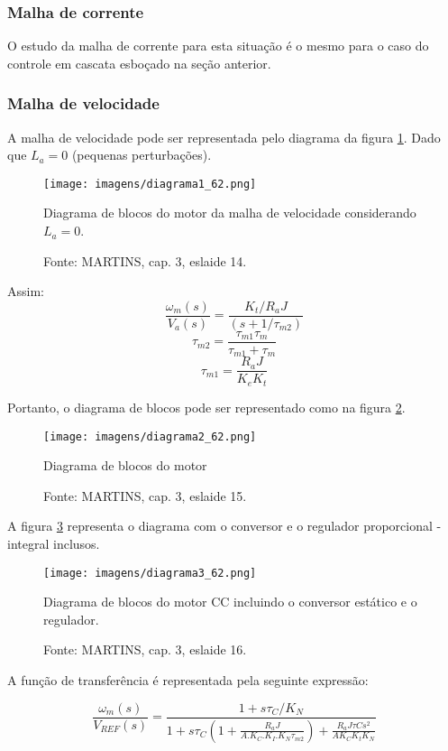 \subsubsection{Malha de corrente}

O estudo da malha de corrente para esta situação é o mesmo para o caso do controle em cascata esboçado na seção anterior.

\subsubsection{Malha de velocidade}

A malha de velocidade pode ser representada pelo diagrama da figura \ref{fig:D1_62}. Dado que $L_{a} = 0$ (pequenas perturbações).

\begin{figure}[ht!]
\center
\texttt{[image: imagens/diagrama1\_62.png]}
\caption{\label{fig:D1_62} Diagrama de blocos do motor da malha de velocidade considerando $L_{a} = 0$.}
\caption*{Fonte: MARTINS, cap. 3, eslaide 14.}
\end{figure}

Assim:
\[\frac{\omega_{m}(s)}{V_{a}(s)} = \frac{K_{t}/R_{a}J}{\left(s + 1/\tau_{m2}\right)}\]
\[\tau_{m2} = \frac{\tau_{m1}\tau_{m}}{\tau_{m1} + \tau_{m}}\]
\[\tau_{m1} = \frac{R_{a}J}{K_{e}K_{t}}\]

Portanto, o diagrama de blocos pode ser representado como na figura \ref{fig:D2_62}.

\begin{figure}[ht!]
\center
\texttt{[image: imagens/diagrama2\_62.png]}
\caption{\label{fig:D2_62} Diagrama de blocos do motor}
\caption*{Fonte: MARTINS, cap. 3, eslaide 15.}
\end{figure}

A figura \ref{fig:D3_62} representa o diagrama com o conversor e o regulador proporcional - integral inclusos.

\begin{figure}[ht!]
\center
\texttt{[image: imagens/diagrama3\_62.png]}
\caption{\label{fig:D3_62} Diagrama de blocos do motor CC incluindo o conversor estático e o regulador.}
\caption*{Fonte: MARTINS, cap. 3, eslaide 16.}
\end{figure}

A função de transferência é representada pela seguinte expressão:

\[\frac{\omega_{m}(s)}{V_{REF}(s)} = \frac{1 + s\tau_{C}/K_{N}}{1 + s\tau_{C}\left(1 + \frac{R_{a}J}{A.K_{C}.K_{I}.K_{N}\tau_{m2}}\right) +\frac{R_{a}J\tau{C}s^{2}}{AK_{C}K_{t}K_{N}}}\]

